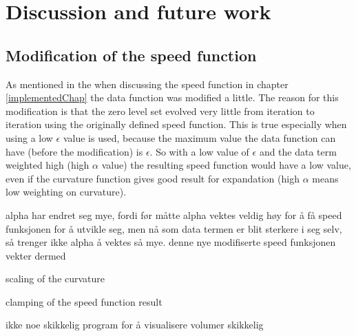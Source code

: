 \chapter{Discussion and future work}
\label{discussionChap}
\section{Modification of the speed function}
As mentioned in the when discussing the speed function in chapter \ref{implementedChap} the data function was modified a little. The reason for this modification is that the zero level set evolved very little from iteration to iteration using the originally defined speed function. This is true especially when using a low $\epsilon$ value is used, because the maximum value the data function can have (before the modification) is $\epsilon$. So with a low value of $\epsilon$ and the data term weighted high (high $\alpha$ value) the resulting speed function would have a low value, even if the curvature function gives good result for expandation (high $\alpha$ means low weighting on curvature).

alpha har endret seg mye, fordi før måtte alpha vektes veldig høy for å få speed funksjonen for å utvikle seg, men nå som data termen er blit sterkere i seg selv, så trenger ikke alpha å vektes så mye. denne nye modifiserte speed funksjonen vekter dermed 

scaling of the curvature

clamping of the speed function result

ikke noe skikkelig program for å visualisere volumer skikkelig
